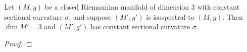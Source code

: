 \begin{proposition}\cite[prop. E.IV.18 of]{Berger.Gauduchon.Mazet-[SpectreVarieteRiemannienne]1971a}
  Let $(M,g)$ be a closed Riemannian manifold of dimension $3$ with constant sectional curvature $\sigma$, and suppose $(M',g')$ is isospectral to $(M,g)$. Then $\dim M' =3$ and $(M',g')$ has constant sectional curvature $\sigma$.
\end{proposition}
\begin{proof}

\end{proof}











\